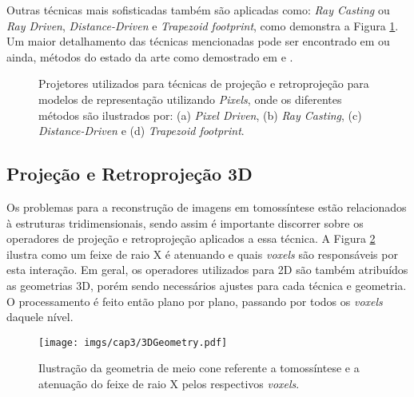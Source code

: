 Outras técnicas mais sofisticadas também são aplicadas como: \textit{Ray Casting} ou \textit{Ray Driven}, \textit{Distance-Driven} \cite{de2002distance,de2004distance} e \textit{Trapezoid footprint}, como demonstra a Figura \ref{fig:imgCap3Projetores}. Um maior detalhamento das técnicas mencionadas pode ser encontrado em  ou ainda, métodos do estado da arte como demostrado em  e .

\begin{figure}[H]
	\centering
	
	\caption{Projetores utilizados para técnicas de projeção e retroprojeção para modelos de representação utilizando \textit{Pixels}, onde os diferentes métodos são ilustrados por: (a) \textit{Pixel Driven}, (b) \textit{Ray Casting}, (c) \textit{Distance-Driven} e (d) \textit{Trapezoid footprint}.}
	
	\hfil
	\hfil
	\hfil
	\hfil
	
	\label{fig:imgCap3Projetores}
\end{figure}  
  
\subsection{Projeção e Retroprojeção 3D}\label{ProjeçãoeRetroprojeção3D}

Os problemas para a reconstrução de imagens em tomossíntese estão relacionados à estruturas tridimensionais, sendo assim é importante discorrer sobre os operadores de projeção e retroprojeção aplicados a essa técnica. A Figura \ref{fig:imgCap33DGeometry} ilustra como um feixe de raio X é atenuando e quais \textit{voxels} são responsáveis por esta interação. Em geral, os operadores utilizados para \acs{2D} são também atribuídos as geometrias \acs{3D}, porém sendo necessários ajustes para cada técnica e geometria. O processamento é feito então plano por plano, passando por todos os \textit{voxels} daquele nível. 

\begin{figure}[htb]
	\caption{Ilustração da geometria de meio cone referente a tomossíntese e a atenuação do feixe de raio X pelos respectivos \textit{voxels}.}
	\begin{center}
		\texttt{[image: imgs/cap3/3DGeometry.pdf]}
	\end{center}
	\label{fig:imgCap33DGeometry}
\end{figure}

